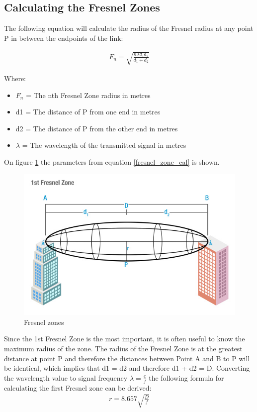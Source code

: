 \subsection{Calculating the Fresnel Zones}
The following equation will calculate the radius of the Fresnel radius at any point P in between the endpoints of the link: 

\begin{align}
F_n = \sqrt{\frac{n \lambda d_1 d_2}{d_1+d_2}} \label{fresnel_zone_cal}
\end{align}

Where:
\begin{itemize}[label=]
\item $F_n$ = The nth Fresnel Zone radius in metres
\item d1 = The distance of P from one end in metres
\item d2 = The distance of P from the other end in metres
\item $\lambda$ = The wavelength of the transmitted signal in metres
\end{itemize}

\noindent On figure \ref{fig:fresnel_zones} the parameters from equation \ref{fresnel_zone_cal} is shown. 
\begin{figure}[H]
	\centering
	\includegraphics[scale=0.70]{figures/fresnel_zone.jpg}
	\caption{Fresnel zones}
	\label{fig:fresnel_zones}
\end{figure}  

Since the 1st Fresnel Zone is the most important, it is often useful to know the maximum radius of the zone. The radius of the Fresnel Zone is at the greatest distance at point P and therefore the distances between Point A and B to P will be identical, which implies that d1 = d2 and therefore d1 + d2 = D. Converting the wavelength value to signal frequency $\lambda = \frac{c}{f}$ the following formula for calculating the first Fresnel zone can be derived:
\begin{align}
r= 8.657 \sqrt{\frac{D}{f}} \label{eq:fresnel_radius}
\end{align}

